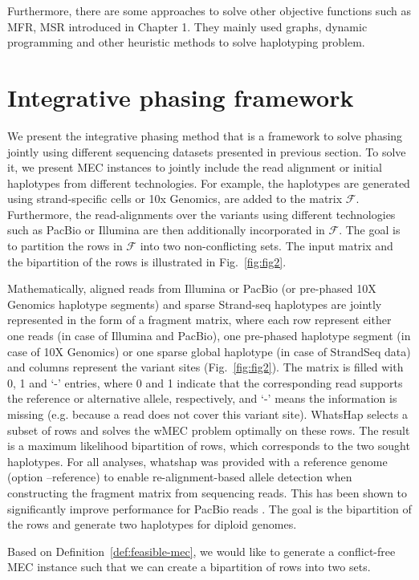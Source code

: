 Furthermore, there are some approaches to solve other objective functions such as MFR, MSR introduced in Chapter 1.
They mainly used graphs, dynamic programming and other heuristic methods to solve haplotyping problem.
\section{Integrative phasing framework}
We present the integrative phasing method that is a framework to solve phasing jointly using different sequencing datasets presented in previous section.
To solve it, we present MEC instances to jointly include the read alignment or initial haplotypes from different technologies.
For example, the haplotypes are generated using strand-specific cells or 10x Genomics, are added to the matrix $\mathcal{F}$. Furthermore, the read-alignments over the variants using different technologies such as PacBio or Illumina are then additionally incorporated in $\mathcal{F}$.
The goal is to partition the rows in $\mathcal{F}$ into two non-conflicting sets.
The input matrix and the bipartition of the rows is illustrated in Fig.~\ref{fig:fig2}.

Mathematically, aligned reads from Illumina or PacBio (or pre-phased 10X Genomics haplotype segments) and sparse Strand-seq haplotypes are jointly represented in the form of a fragment matrix, where each  row represent either one reads (in case of Illumina and PacBio), 
one pre-phased haplotype segment (in case of 10X Genomics) or one sparse global haplotype (in case of StrandSeq data) and columns represent the variant sites (Fig.~\ref{fig:fig2}). 
The matrix is filled with 0, 1 and ‘-’ entries, where 0 and 1 indicate that the corresponding read supports the reference or alternative allele, respectively,  and ‘-’ means the information is missing 
(e.g. because a read does not cover this variant site). WhatsHap selects a subset of rows and solves the wMEC problem optimally on these rows. 
The result is a maximum likelihood bipartition of rows, which corresponds to the two sought haplotypes.
For all analyses, whatshap was provided with a reference genome (option --reference) to enable re-alignment-based allele detection when constructing the fragment matrix from sequencing reads. 
This has been shown to significantly improve performance for PacBio reads \citep{martin2016whatshap}.
The goal is the bipartition of the rows and generate two haplotypes for diploid genomes.

Based on Definition~\ref{def:feasible-mec}, we would like to generate a conflict-free MEC instance such that we can create a bipartition of rows into two sets. 


